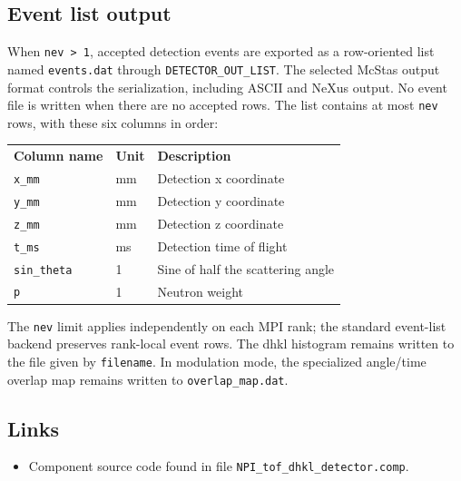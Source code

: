 \subsection*{Event list output}
When \texttt{nev > 1}, accepted detection events are exported as a row-oriented list named
\texttt{events.dat} through \texttt{DETECTOR\_OUT\_LIST}. The selected McStas output format
controls the serialization, including ASCII and NeXus output. No event file is written when
there are no accepted rows. The list contains at most \texttt{nev} rows, with these six columns
in order:

\begin{center}
\begin{tabular}{lll}
\textbf{Column name} & \textbf{Unit} & \textbf{Description} \\
\texttt{x\_mm} & mm & Detection x coordinate \\
\texttt{y\_mm} & mm & Detection y coordinate \\
\texttt{z\_mm} & mm & Detection z coordinate \\
\texttt{t\_ms} & ms & Detection time of flight \\
\texttt{sin\_theta} & 1 & Sine of half the scattering angle \\
\texttt{p} & 1 & Neutron weight \\
\end{tabular}
\end{center}

The \texttt{nev} limit applies independently on each MPI rank; the standard event-list backend
preserves rank-local event rows. The dhkl histogram remains written to the file given by \texttt{filename}. In modulation mode,
the specialized angle/time overlap map remains written to \texttt{overlap\_map.dat}.

\subsection*{Links}
\begin{itemize}
  \item Component source code found in file \texttt{NPI\_tof\_dhkl\_detector.comp}.
\end{itemize}
